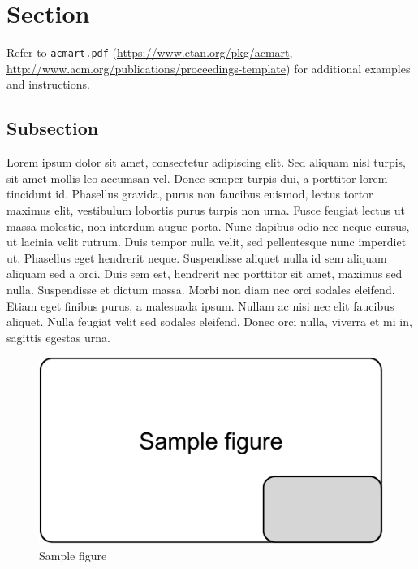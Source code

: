 \documentclass[10pt,sigconf]{acmart}
\begin{document}




\maketitle

\section{Section}

Refer to \verb|acmart.pdf| \cite{veytsmanlatex} (\url{https://www.ctan.org/pkg/acmart}, \url{http://www.acm.org/publications/proceedings-template}) for additional examples and instructions.

\subsection{Subsection}

Lorem ipsum dolor sit amet, consectetur adipiscing elit.
Sed aliquam nisl turpis, sit amet mollis leo accumsan vel.
Donec semper turpis dui, a porttitor lorem tincidunt id.
Phasellus gravida, purus non faucibus euismod, lectus tortor maximus elit, vestibulum lobortis purus turpis non urna.
Fusce feugiat lectus ut massa molestie, non interdum augue porta.
Nunc dapibus odio nec neque cursus, ut lacinia velit rutrum.
Duis tempor nulla velit, sed pellentesque nunc imperdiet ut.
Phasellus eget hendrerit neque.
Suspendisse aliquet nulla id sem aliquam aliquam sed a orci.
Duis sem est, hendrerit nec porttitor sit amet, maximus sed nulla.
Suspendisse et dictum massa.
Morbi non diam nec orci sodales eleifend.
Etiam eget finibus purus, a malesuada ipsum.
Nullam ac nisi nec elit faucibus aliquet.
Nulla feugiat velit sed sodales eleifend.
Donec orci nulla, viverra et mi in, sagittis egestas urna.

\begin{figure}[htbp]
  \centering
  \includegraphics[scale=0.5]{sample-figure}
  \caption{Sample figure}
  \label{fig:sample}
\end{figure}
\end{document}
